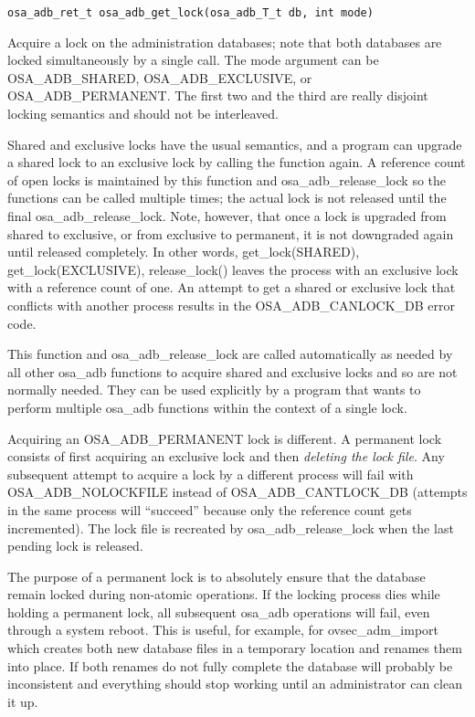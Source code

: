 \begin{verbatim}
osa_adb_ret_t osa_adb_get_lock(osa_adb_T_t db, int mode)
\end{verbatim}

Acquire a lock on the administration databases; note that both
databases are locked simultaneously by a single call.  The mode
argument can be OSA_ADB_SHARED, OSA_ADB_EXCLUSIVE, or
OSA_ADB_PERMANENT.  The first two and the third are really disjoint
locking semantics and should not be interleaved.

Shared and exclusive locks have the usual semantics, and a program can
upgrade a shared lock to an exclusive lock by calling the function
again.  A reference count of open locks is maintained by this function
and osa_adb_release_lock so the functions can be called multiple
times; the actual lock is not released until the final
osa_adb_release_lock.  Note, however, that once a lock is upgraded
from shared to exclusive, or from exclusive to permanent, it is not
downgraded again until released completely.  In other words,
get_lock(SHARED), get_lock(EXCLUSIVE), release_lock() leaves the
process with an exclusive lock with a reference count of one.  An
attempt to get a shared or exclusive lock that conflicts with another
process results in the OSA_ADB_CANLOCK_DB error code.

This function and osa_adb_release_lock are called automatically as
needed by all other osa_adb functions to acquire shared and exclusive
locks and so are not normally needed.  They can be used explicitly by
a program that wants to perform multiple osa_adb functions within the
context of a single lock.

Acquiring an OSA_ADB_PERMANENT lock is different.  A permanent lock
consists of first acquiring an exclusive lock and then {\it deleting
the lock file}.  Any subsequent attempt to acquire a lock by a
different process will fail with OSA_ADB_NOLOCKFILE instead of
OSA_ADB_CANTLOCK_DB (attempts in the same process will ``succeed''
because only the reference count gets incremented).  The lock file is
recreated by osa_adb_release_lock when the last pending lock is released.

The purpose of a permanent lock is to absolutely ensure that the
database remain locked during non-atomic operations.  If the locking
process dies while holding a permanent lock, all subsequent osa_adb
operations will fail, even through a system reboot.  This is useful,
for example, for ovsec_adm_import which creates both new database
files in a temporary location and renames them into place.  If both
renames do not fully complete the database will probably be
inconsistent and everything should stop working until an administrator
can clean it up.

